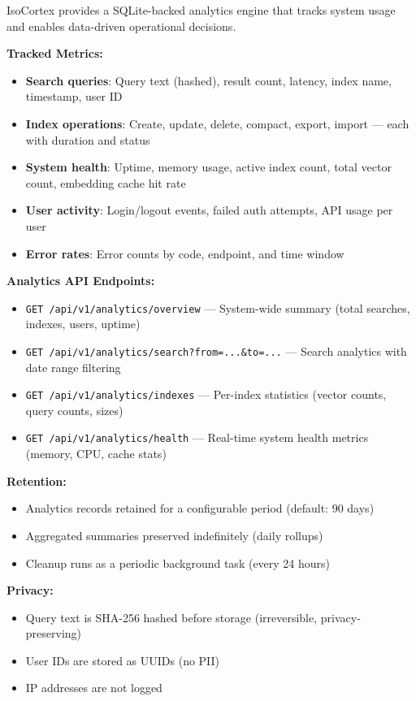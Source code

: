\documentclass[11pt,a4paper]{article}
\newcommand{\inlinecode}[1]{\texttt{\small\colorbox{ctCodeBg}{#1}}}
\begin{document}
\begin{reqbox}
IsoCortex provides a SQLite-backed analytics engine that tracks system usage and enables data-driven operational decisions.

\textbf{Tracked Metrics:}
\begin{itemize}
    \item \textbf{Search queries}: Query text (hashed), result count, latency, index name, timestamp, user ID
    \item \textbf{Index operations}: Create, update, delete, compact, export, import --- each with duration and status
    \item \textbf{System health}: Uptime, memory usage, active index count, total vector count, embedding cache hit rate
    \item \textbf{User activity}: Login/logout events, failed auth attempts, API usage per user
    \item \textbf{Error rates}: Error counts by code, endpoint, and time window
\end{itemize}

\textbf{Analytics API Endpoints:}
\begin{itemize}
    \item \inlinecode{GET /api/v1/analytics/overview} --- System-wide summary (total searches, indexes, users, uptime)
    \item \inlinecode{GET /api/v1/analytics/search?from=...&to=...} --- Search analytics with date range filtering
    \item \inlinecode{GET /api/v1/analytics/indexes} --- Per-index statistics (vector counts, query counts, sizes)
    \item \inlinecode{GET /api/v1/analytics/health} --- Real-time system health metrics (memory, CPU, cache stats)
\end{itemize}

\textbf{Retention:}
\begin{itemize}
    \item Analytics records retained for a configurable period (default: 90 days)
    \item Aggregated summaries preserved indefinitely (daily rollups)
    \item Cleanup runs as a periodic background task (every 24 hours)
\end{itemize}

\textbf{Privacy:}
\begin{itemize}
    \item Query text is SHA-256 hashed before storage (irreversible, privacy-preserving)
    \item User IDs are stored as UUIDs (no PII)
    \item IP addresses are not logged
\end{itemize}
\end{reqbox}
\end{document}
